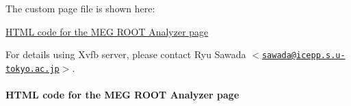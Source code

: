 The custom page file is shown here:


\begin{DoxyItemize}
\item \hyperlink{RC_MEG_ROOT_code}{HTML code for the MEG ROOT Analyzer page}
\end{DoxyItemize}

For details using Xvfb server, please contact Ryu Sawada $<$\href{mailto:sawada@icepp.s.u-tokyo.ac.jp}{\tt sawada@icepp.s.u-\/tokyo.ac.jp}$>$.

\par
 \par
 \label{index_end}
\hypertarget{index_end}{}
  \paragraph{HTML code for the MEG ROOT Analyzer page}\label{RC_MEG_ROOT_code}



